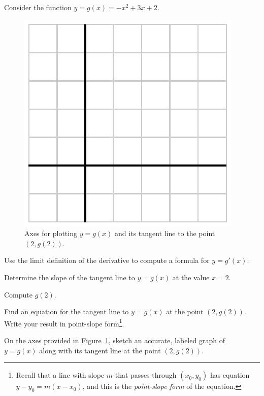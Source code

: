 \begin{pa} \label{PA:1.8}
Consider the function $y = g(x) = -x^2+3x+2$.
\begin{figure}[h]
\begin{center}
\includegraphics{figures/1_8_PA1.eps}
\caption{Axes for plotting $y = g(x)$ and its tangent line to the point $(2,g(2))$.} \label{F:1.8.PA1}
\end{center}
\end{figure}
\ba
	\item Use the limit definition of the derivative to compute a formula for $y = g'(x)$.
	\item Determine the slope of the tangent line to $y = g(x)$ at the value $x = 2$.
	\item Compute $g(2)$.
	\item Find an equation for the tangent line to $y = g(x)$ at the point $(2,g(2))$.  Write your result in point-slope form\footnote{Recall that a line with slope $m$ that passes through $(x_0,y_0)$ has equation $y - y_0 = m(x - x_0)$, and this is the \emph{point-slope form} of the equation.}.
	\item On the axes provided in Figure~\ref{F:1.8.PA1}, sketch an accurate, labeled graph of $y = g(x)$ along with its tangent line at the point $(2,g(2))$.
\ea
\end{pa} 

\afterpa

